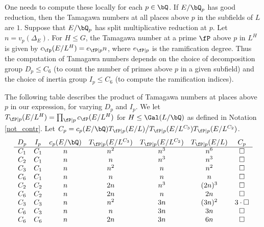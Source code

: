 \begin{example}
    One needs to compute these locally for each $p \in \bQ$. If $E / \bQ_p$ has good reduction, then the Tamagawa numbers at all places above $p$ in the subfields of $L$ are $1$. Suppose that $E / \bQ_p$ has split multiplicative reduction at $p$. Let $n = v_p(\Delta_E)$. For $H \leq G$, the Tamagawa number at a prime $\fP$ above $p$ in $L^H$ is given by $c_{\fp}(E / L^H) = e_{\fP \mid p} n$, where $e_{\fP \mid p}$ is the ramification degree. Thus the computation of Tamagawa numbers depends on the choice of decomposition group $D_p \leq C_6$ (to count the number of primes above $p$ in a given subfield) and the choice of inertia group $I_p \leq C_6$ (to compute the ramification indices). 
    
    The following table describes the product of Tamagawa numbers at places above $p$ in our expression, for varying $D_p$ and $I_p$. We let $T_{\fP \mid p}(E / L^H) = \prod_{\fP \mid p}c_{\fP}(E / L^H)$ for $H \leq \Gal(L / \bQ)$ as defined in Notation \ref{not_contr}. Let $C_p = c_p(E / \bQ)T_{\fP \mid p}(E / L) \big/ T_{\fP \mid p}(E / L^{C_3})T_{\fP \mid p}(E / L^{C_2})$. 
    \[
    \begin{array}{c c c c c c c}
        D_p & I_p & c_p(E / \bQ) & T_{\fP \mid p}(E / L^{C_3}) & T_{\fP \mid p}(E / L^{C_2}) & T_{\fP \mid p}(E / L) & C_p\\ 
        \hline
        C_1 & C_1 & n & n^2 & n^3 & n^6 & \square\\
        C_2 & C_1 & n & n & n^3 & n^3 & \square\\
        C_3 & C_1 & n & n^2 & n & n^2 & \square \\
        C_6 & C_1 & n & n & n & n & \square \\
        C_2 & C_2 & n & 2n & n^3 & (2n)^3 & \square \\
        C_6 & C_2 & n & 2n & n & 2n & \square \\
        C_3 & C_3 & n & n^2 & 3n & (3n)^2 & 3\cdot\square \\
        C_6 & C_3 & n & n & 3n & 3n & \square\\
        C_6 & C_6 & n & 2n & 3n & 6n & \square
    \end{array}
    \]


\end{example}
